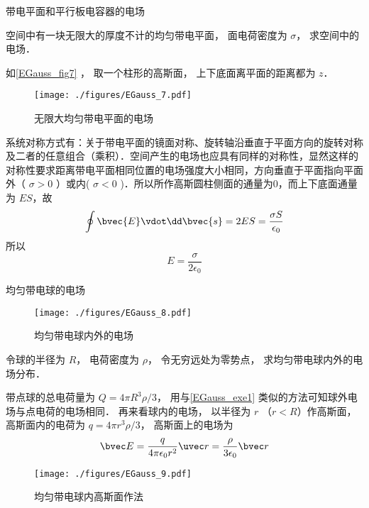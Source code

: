 \begin{example}{带电平面和平行板电容器的电场}

空间中有一块无限大的厚度不计的均匀带电平面， 面电荷密度为 $\sigma$， 求空间中的电场．

如\autoref{EGauss_fig7} ， 取一个柱形的高斯面， 上下底面离平面的距离都为 $z$．
\begin{figure}[ht]
\centering
\texttt{[image: ./figures/EGauss\_7.pdf]}
\caption{无限大均匀带电平面的电场} \label{EGauss_fig7}
\end{figure}
系统对称方式有：关于带电平面的镜面对称、旋转轴沿垂直于平面方向的旋转对称及二者的任意组合（乘积）．空间产生的电场也应具有同样的对称性，显然这样的对称性要求距离带电平面相同位置的电场强度大小相同，方向垂直于平面指向平面外（ $\sigma>0$ ）或内( $\sigma<0$ )．所以所作高斯圆柱侧面的通量为0，而上下底面通量为 $ES$，故
\begin{equation}
\oint \bvec{E}\vdot \dd\bvec{s}=2ES=\frac{\sigma S}{\epsilon_0}
\end{equation}
所以
\begin{equation}
E=\frac{\sigma}{2\epsilon_0}
\end{equation}

\end{example}

\begin{example}{均匀带电球的电场}\label{EGauss_exe3}
\begin{figure}[ht]
\centering
\texttt{[image: ./figures/EGauss\_8.pdf]}
\caption{均匀带电球内外的电场} \label{EGauss_fig8}
\end{figure}
令球的半径为 $R$， 电荷密度为 $\rho$， 令无穷远处为零势点， 求均匀带电球内外的电场分布． 

带点球的总电荷量为 $Q = 4\pi R^3\rho/3$， 用与\autoref{EGauss_exe1} 类似的方法可知球外电场与点电荷的电场相同． 再来看球内的电场， 以半径为 $r$ （$r < R$）作高斯面， 高斯面内的电荷为 $q = 4\pi r^3\rho/3$， 高斯面上的电场为
\begin{equation}
\bvec E = \frac{q}{4\pi\epsilon_0 r^2} \uvec r = \frac{\rho}{3\epsilon_0}\bvec r
\end{equation}
\begin{figure}[ht]
\centering
\texttt{[image: ./figures/EGauss\_9.pdf]}
\caption{均匀带电球内高斯面作法} \label{EGauss_fig9}
\end{figure}
\end{example}

